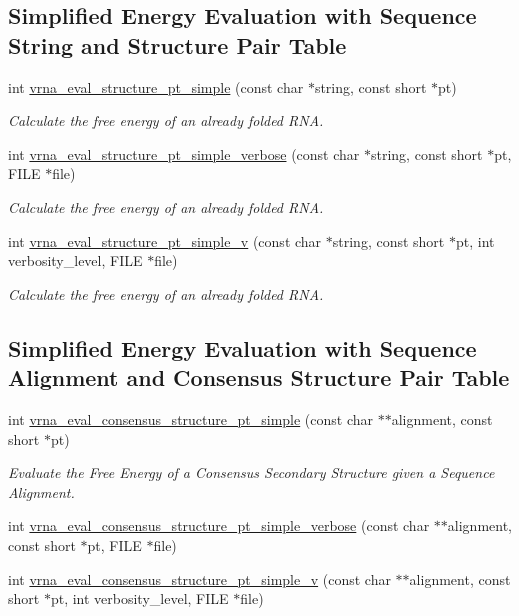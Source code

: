 \subsection*{Simplified Energy Evaluation with Sequence String and Structure Pair Table}
\begin{DoxyCompactItemize}
\item 
int \mbox{\hyperlink{group__eval_ga0bba59b4d6e53461088666ff4aece7b0}{vrna\+\_\+eval\+\_\+structure\+\_\+pt\+\_\+simple}} (const char $\ast$string, const short $\ast$pt)
\begin{DoxyCompactList}\small\item\em Calculate the free energy of an already folded R\+NA. \end{DoxyCompactList}\item 
int \mbox{\hyperlink{group__eval_ga76e152ee9a02be23da14cdddf52b4e44}{vrna\+\_\+eval\+\_\+structure\+\_\+pt\+\_\+simple\+\_\+verbose}} (const char $\ast$string, const short $\ast$pt, F\+I\+LE $\ast$file)
\begin{DoxyCompactList}\small\item\em Calculate the free energy of an already folded R\+NA. \end{DoxyCompactList}\item 
int \mbox{\hyperlink{group__eval_gac40b813d35289da9816d0c1eec94faa5}{vrna\+\_\+eval\+\_\+structure\+\_\+pt\+\_\+simple\+\_\+v}} (const char $\ast$string, const short $\ast$pt, int verbosity\+\_\+level, F\+I\+LE $\ast$file)
\begin{DoxyCompactList}\small\item\em Calculate the free energy of an already folded R\+NA. \end{DoxyCompactList}\end{DoxyCompactItemize}
\subsection*{Simplified Energy Evaluation with Sequence Alignment and Consensus Structure Pair Table}
\begin{DoxyCompactItemize}
\item 
int \mbox{\hyperlink{group__eval_gabbb4d2a7aa324ec9cce8f47ce61ab8af}{vrna\+\_\+eval\+\_\+consensus\+\_\+structure\+\_\+pt\+\_\+simple}} (const char $\ast$$\ast$alignment, const short $\ast$pt)
\begin{DoxyCompactList}\small\item\em Evaluate the Free Energy of a Consensus Secondary Structure given a Sequence Alignment. \end{DoxyCompactList}\item 
int \mbox{\hyperlink{group__eval_ga2769e4369d023ad2d5c5f4d2ee825c23}{vrna\+\_\+eval\+\_\+consensus\+\_\+structure\+\_\+pt\+\_\+simple\+\_\+verbose}} (const char $\ast$$\ast$alignment, const short $\ast$pt, F\+I\+LE $\ast$file)
\item 
int \mbox{\hyperlink{group__eval_gaf2d227b3d54bf9b693a3df52faf5e2e4}{vrna\+\_\+eval\+\_\+consensus\+\_\+structure\+\_\+pt\+\_\+simple\+\_\+v}} (const char $\ast$$\ast$alignment, const short $\ast$pt, int verbosity\+\_\+level, F\+I\+LE $\ast$file)
\end{DoxyCompactItemize}

